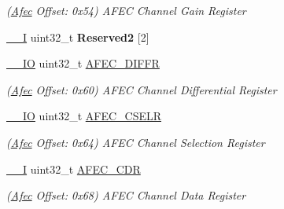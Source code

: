\begin{DoxyCompactItemize}
\begin{DoxyCompactList}\small\item\em (\mbox{\hyperlink{structAfec}{Afec}} Offset\+: 0x54) A\+F\+EC Channel Gain Register \end{DoxyCompactList}\item 
\mbox{\label{structAfec_a2bfdb285f4328334d147a70b86001f0b}} 
\mbox{\hyperlink{core__cm7_8h_af63697ed9952cc71e1225efe205f6cd3}{\+\_\+\+\_\+I}} uint32\+\_\+t {\bfseries Reserved2} \mbox{[}2\mbox{]}
\item 
\mbox{\label{structAfec_a8c16f2f9eff021e925d5b5cee528b373}} 
\mbox{\hyperlink{core__cm7_8h_aec43007d9998a0a0e01faede4133d6be}{\+\_\+\+\_\+\+IO}} uint32\+\_\+t \mbox{\hyperlink{structAfec_a8c16f2f9eff021e925d5b5cee528b373}{A\+F\+E\+C\+\_\+\+D\+I\+F\+FR}}
\begin{DoxyCompactList}\small\item\em (\mbox{\hyperlink{structAfec}{Afec}} Offset\+: 0x60) A\+F\+EC Channel Differential Register \end{DoxyCompactList}\item 
\mbox{\label{structAfec_a2b446a6ad57fd557f1b923a845f7b8e6}} 
\mbox{\hyperlink{core__cm7_8h_aec43007d9998a0a0e01faede4133d6be}{\+\_\+\+\_\+\+IO}} uint32\+\_\+t \mbox{\hyperlink{structAfec_a2b446a6ad57fd557f1b923a845f7b8e6}{A\+F\+E\+C\+\_\+\+C\+S\+E\+LR}}
\begin{DoxyCompactList}\small\item\em (\mbox{\hyperlink{structAfec}{Afec}} Offset\+: 0x64) A\+F\+EC Channel Selection Register \end{DoxyCompactList}\item 
\mbox{\label{structAfec_a2511dc698c07554bfc49fa46e51d4939}} 
\mbox{\hyperlink{core__cm7_8h_af63697ed9952cc71e1225efe205f6cd3}{\+\_\+\+\_\+I}} uint32\+\_\+t \mbox{\hyperlink{structAfec_a2511dc698c07554bfc49fa46e51d4939}{A\+F\+E\+C\+\_\+\+C\+DR}}
\begin{DoxyCompactList}\small\item\em (\mbox{\hyperlink{structAfec}{Afec}} Offset\+: 0x68) A\+F\+EC Channel Data Register \end{DoxyCompactList}\item 
\mbox{\label{structAfec_a24451f90e1e0434b5f6b8522066fdc67}} 

\end{DoxyCompactItemize}
